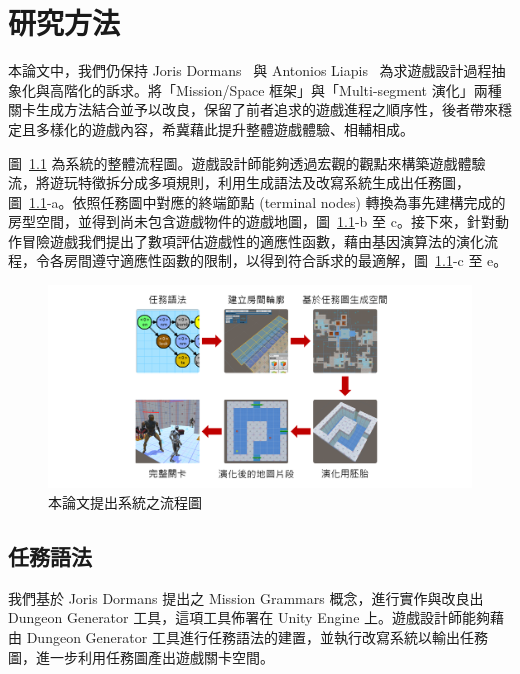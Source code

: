 \chapter{研究方法}
\label{cha:methodology}

本論文中，我們仍保持 Joris Dormans~\cite{dormans2010adventures} 與 Antonios Liapis~\cite{liapis2013generating} 為求遊戲設計過程抽象化與高階化的訴求。將「Mission/Space 框架」與「Multi-segment 演化」兩種關卡生成方法結合並予以改良，保留了前者追求的遊戲進程之順序性，後者帶來穩定且多樣化的遊戲內容，希冀藉此提升整體遊戲體驗、相輔相成。

圖~\ref{fig:system-framework} 為系統的整體流程圖。遊戲設計師能夠透過宏觀的觀點來構築遊戲體驗流，將遊玩特徵拆分成多項規則，利用生成語法及改寫系統生成出任務圖，圖~\ref{fig:system-framework}-a。依照任務圖中對應的終端節點 (terminal nodes) 轉換為事先建構完成的房型空間，並得到尚未包含遊戲物件的遊戲地圖，圖~\ref{fig:system-framework}-b 至 c。接下來，針對動作冒險遊戲我們提出了數項評估遊戲性的適應性函數，藉由基因演算法的演化流程，令各房間遵守適應性函數的限制，以得到符合訴求的最適解，圖~\ref{fig:system-framework}-c 至 e。

\begin{figure}[h]
  \begin{center}
    \includegraphics[width=1.0\textwidth]{figures/系統框架.png}
    \caption{本論文提出系統之流程圖} 
    \label{fig:system-framework}
  \end{center}
\end{figure}

\section{任務語法}
\label{sec:method-missiongrammars}

我們基於 Joris Dormans 提出之 Mission Grammars 概念，進行實作與改良出 Dungeon Generator 工具，這項工具佈署在 Unity Engine 上。遊戲設計師能夠藉由 Dungeon Generator 工具進行任務語法的建置，並執行改寫系統以輸出任務圖，進一步利用任務圖產出遊戲關卡空間。

